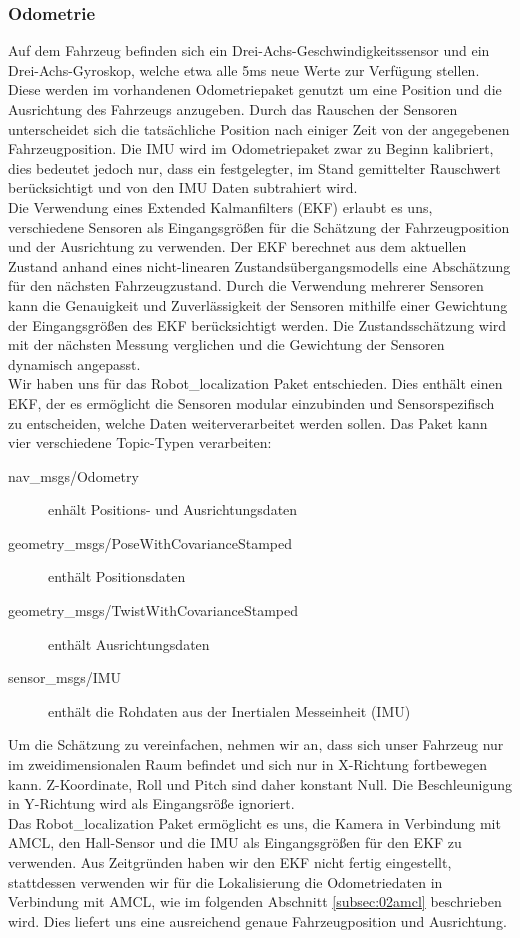\subsubsection{Odometrie}
\label{subsec:02odom}
Auf dem Fahrzeug befinden sich ein Drei-Achs-Geschwindigkeitssensor und ein Drei-Achs-Gyroskop, welche etwa alle 5ms neue Werte zur Verf\"ugung stellen. Diese werden im vorhandenen Odometriepaket genutzt um eine Position und die Ausrichtung des Fahrzeugs anzugeben. Durch das Rauschen der Sensoren unterscheidet sich die tats\"achliche Position  nach einiger Zeit von der angegebenen Fahrzeugposition. Die IMU wird im Odometriepaket zwar zu Beginn kalibriert, dies bedeutet jedoch nur, dass ein festgelegter, im Stand gemittelter Rauschwert ber\"ucksichtigt und von den IMU Daten subtrahiert wird.\\
Die Verwendung eines Extended Kalmanfilters (EKF) erlaubt es uns, verschiedene Sensoren als Eingangsgr\"o{\ss}en f\"ur die Sch\"atzung der Fahrzeugposition und der Ausrichtung zu verwenden. Der EKF berechnet aus dem aktuellen Zustand anhand eines nicht-linearen Zustands\"ubergangsmodells eine Absch\"atzung f\"ur den n\"achsten Fahrzeugzustand. Durch die Verwendung mehrerer Sensoren kann die Genauigkeit und Zuverl\"assigkeit der Sensoren mithilfe einer Gewichtung der Eingangsgr\"o{\ss}en des EKF ber\"ucksichtigt werden.  Die Zustandssch\"atzung wird mit der n\"achsten Messung verglichen und die Gewichtung der Sensoren dynamisch angepasst.\\
Wir haben uns f\"ur das Robot\_localization Paket entschieden. Dies enth\"alt einen EKF, der es erm\"oglicht die Sensoren modular einzubinden und Sensorspezifisch zu entscheiden, welche Daten weiterverarbeitet werden sollen.
Das Paket kann vier verschiedene Topic-Typen verarbeiten:\begin{description}
	\item[nav\_msgs/Odometry] enh\"alt Positions- und Ausrichtungsdaten
	\item[geometry\_msgs/PoseWithCovarianceStamped] enth\"alt Positionsdaten
	\item[geometry\_msgs/TwistWithCovarianceStamped] enth\"alt Ausrichtungsdaten
	\item[sensor\_msgs/IMU] enth\"alt die Rohdaten aus der Inertialen Messeinheit (IMU)
\end{description}
Um die Sch\"atzung zu vereinfachen, nehmen wir an, dass sich unser Fahrzeug nur im zweidimensionalen Raum befindet und sich nur in X-Richtung fortbewegen kann. Z-Koordinate, Roll und Pitch sind daher konstant Null. Die Beschleunigung in Y-Richtung wird als Eingangsr\"o{\ss}e ignoriert. \\
Das Robot\_localization Paket erm\"oglicht es uns, die Kamera in Verbindung mit  AMCL, den Hall-Sensor und die IMU als Eingangsgr\"o{\ss}en f\"ur den EKF zu verwenden. Aus Zeitgr\"unden haben wir den EKF nicht fertig eingestellt, stattdessen verwenden wir f\"ur die Lokalisierung die Odometriedaten in Verbindung mit AMCL, wie im folgenden Abschnitt \ref{subsec:02amcl} beschrieben wird. Dies liefert uns eine ausreichend genaue Fahrzeugposition und Ausrichtung.

